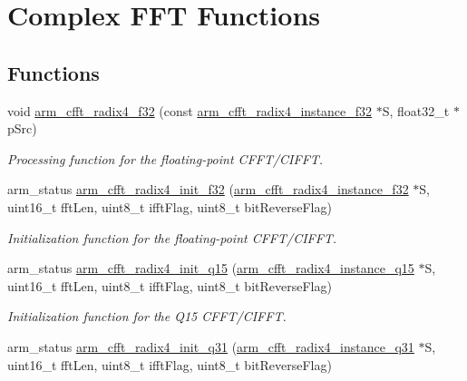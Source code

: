 \hypertarget{group___c_f_f_t___c_i_f_f_t}{\section{Complex F\-F\-T Functions}
\label{group___c_f_f_t___c_i_f_f_t}
}
\subsection*{Functions}
\begin{DoxyCompactItemize}
\item 
void \hyperlink{group___c_f_f_t___c_i_f_f_t_ga521f670cd9c571bc61aff9bec89f4c26}{arm\-\_\-cfft\-\_\-radix4\-\_\-f32} (const \hyperlink{structarm__cfft__radix4__instance__f32}{arm\-\_\-cfft\-\_\-radix4\-\_\-instance\-\_\-f32} $\ast$S, float32\-\_\-t $\ast$p\-Src)
\begin{DoxyCompactList}\small\item\em Processing function for the floating-\/point C\-F\-F\-T/\-C\-I\-F\-F\-T. \end{DoxyCompactList}\item 
arm\-\_\-status \hyperlink{group___c_f_f_t___c_i_f_f_t_gaf336459f684f0b17bfae539ef1b1b78a}{arm\-\_\-cfft\-\_\-radix4\-\_\-init\-\_\-f32} (\hyperlink{structarm__cfft__radix4__instance__f32}{arm\-\_\-cfft\-\_\-radix4\-\_\-instance\-\_\-f32} $\ast$S, uint16\-\_\-t fft\-Len, uint8\-\_\-t ifft\-Flag, uint8\-\_\-t bit\-Reverse\-Flag)
\begin{DoxyCompactList}\small\item\em Initialization function for the floating-\/point C\-F\-F\-T/\-C\-I\-F\-F\-T. \end{DoxyCompactList}\item 
arm\-\_\-status \hyperlink{group___c_f_f_t___c_i_f_f_t_ga0c2acfda3126c452e75b81669e8ad9ef}{arm\-\_\-cfft\-\_\-radix4\-\_\-init\-\_\-q15} (\hyperlink{structarm__cfft__radix4__instance__q15}{arm\-\_\-cfft\-\_\-radix4\-\_\-instance\-\_\-q15} $\ast$S, uint16\-\_\-t fft\-Len, uint8\-\_\-t ifft\-Flag, uint8\-\_\-t bit\-Reverse\-Flag)
\begin{DoxyCompactList}\small\item\em Initialization function for the Q15 C\-F\-F\-T/\-C\-I\-F\-F\-T. \end{DoxyCompactList}\item 
arm\-\_\-status \hyperlink{group___c_f_f_t___c_i_f_f_t_gad5caaafeec900c8ff72321c01bbd462c}{arm\-\_\-cfft\-\_\-radix4\-\_\-init\-\_\-q31} (\hyperlink{structarm__cfft__radix4__instance__q31}{arm\-\_\-cfft\-\_\-radix4\-\_\-instance\-\_\-q31} $\ast$S, uint16\-\_\-t fft\-Len, uint8\-\_\-t ifft\-Flag, uint8\-\_\-t bit\-Reverse\-Flag)

\end{DoxyCompactItemize}

